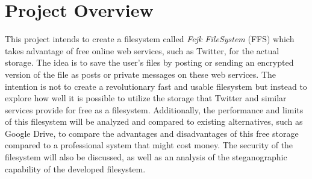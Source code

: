\section{Project Overview}

This project intends to create a filesystem called \textit{Fejk FileSystem} (FFS) which takes advantage of free online web services, such as Twitter, for the actual storage. The idea is to save the user's files by posting or sending an encrypted version of the file as posts or private messages on these web services. The intention is not to create a revolutionary fast and usable filesystem but instead to explore how well it is possible to utilize the storage that Twitter and similar services provide for free as a filesystem. Additionally, the performance and limits of this filesystem will be analyzed and compared to existing alternatives, such as Google Drive, to compare the advantages and disadvantages of this free storage compared to a professional system that might cost money. The security of the filesystem will also be discussed, as well as an analysis of the steganographic capability of the developed filesystem.
